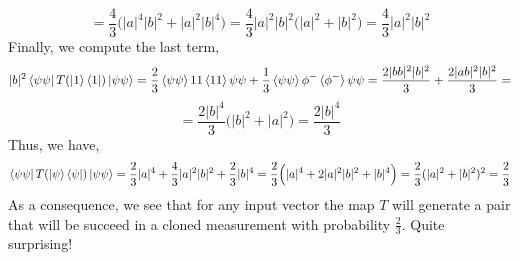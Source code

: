 \documentclass[12pt]{article}
\begin{document}
\begin{enumerate}
$$$$
$$ = \frac{4}{3}\Big(|a|^4|b|^2 + |a|^2|b|^4\Big) = \frac{4}{3}|a|^2|b|^2\Big(|a|^2 + |b|^2\Big) = \frac{4}{3}|a|^2|b|^2$$
Finally, we compute the last term,
$$ 
|b|^2 \bra{\psi \psi} T(\ket{1} \bra{1}) \ket{\psi \psi} = 
\frac{2}{3} \braket{\psi \psi}{11}\braket{11}{\psi \psi} + \frac{1}{3}\braket{\psi \psi}{\phi^-}\braket{\phi^-}{\psi \psi}
= \frac{2|bb|^2|b|^2}{3} + \frac{2|ab|^2|b|^2}{3} =$$
$$ = \frac{2|b|^4}{3}\Big(|b|^2 + |a|^2 \Big) = \frac{2|b|^4}{3} $$
Thus, we have,
$$\bra{\psi \psi} T(\ket{\psi} \bra{\psi}) \ket{\psi \psi} = \frac{2}{3}|a|^4 + \frac{4}{3}|a|^2|b|^2 + \frac{2}{3}|b|^4 = \frac{2}{3}\Big( |a|^4 + 2|a|^2|b|^2 + |b|^4 \Big) = \frac{2}{3} (|a|^2 + |b|^2)^2 = \frac{2}{3}$$
As a consequence, we see that for any input vector the map $T$ will generate a pair that will be succeed in a cloned measurement with probability $\frac{2}{3}$. Quite surprising!


\end{enumerate}
\end{document}
